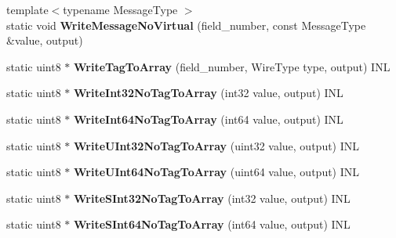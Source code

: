\begin{DoxyCompactItemize}
{\footnotesize template$<$typename Message\+Type $>$ }\\static void {\bfseries Write\+Message\+No\+Virtual} (field\+\_\+number, const Message\+Type \&value, output)
\item 
\mbox{\label{classgoogle_1_1protobuf_1_1internal_1_1WireFormatLite_ac9d4a8857fdce7e48b7dd53f3e436f09}} 
static uint8 $\ast$ {\bfseries Write\+Tag\+To\+Array} (field\+\_\+number, Wire\+Type type, output) I\+NL
\item 
\mbox{\label{classgoogle_1_1protobuf_1_1internal_1_1WireFormatLite_ade3f2cc014e7310defcef7164cea8e5c}} 
static uint8 $\ast$ {\bfseries Write\+Int32\+No\+Tag\+To\+Array} (int32 value, output) I\+NL
\item 
\mbox{\label{classgoogle_1_1protobuf_1_1internal_1_1WireFormatLite_ab2c8de1e9a8a6b5bdd4e1f9a4c0f70c4}} 
static uint8 $\ast$ {\bfseries Write\+Int64\+No\+Tag\+To\+Array} (int64 value, output) I\+NL
\item 
\mbox{\label{classgoogle_1_1protobuf_1_1internal_1_1WireFormatLite_a7d22138813b79ce6407633b0e7c23174}} 
static uint8 $\ast$ {\bfseries Write\+U\+Int32\+No\+Tag\+To\+Array} (uint32 value, output) I\+NL
\item 
\mbox{\label{classgoogle_1_1protobuf_1_1internal_1_1WireFormatLite_ab1621e62376014e886b75db3556ec274}} 
static uint8 $\ast$ {\bfseries Write\+U\+Int64\+No\+Tag\+To\+Array} (uint64 value, output) I\+NL
\item 
\mbox{\label{classgoogle_1_1protobuf_1_1internal_1_1WireFormatLite_a969f7f3256e1e992d76750de6833c06c}} 
static uint8 $\ast$ {\bfseries Write\+S\+Int32\+No\+Tag\+To\+Array} (int32 value, output) I\+NL
\item 
\mbox{\label{classgoogle_1_1protobuf_1_1internal_1_1WireFormatLite_a9ea96f664873502f8837879f2df6856f}} 
static uint8 $\ast$ {\bfseries Write\+S\+Int64\+No\+Tag\+To\+Array} (int64 value, output) I\+NL

\end{DoxyCompactItemize}
